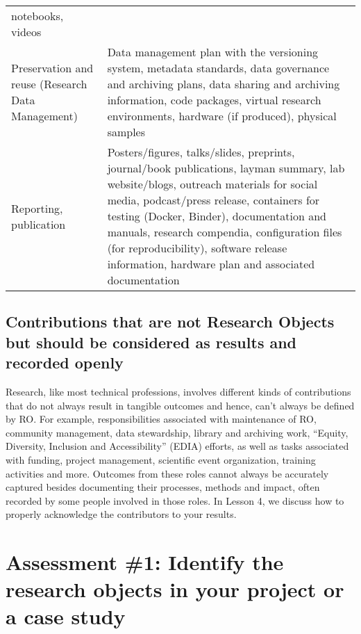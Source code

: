 \documentclass[
  letterpaper,
  DIV=11,
  numbers=noendperiod]{scrreport}
\begin{document}
\begin{longtable}[]{@{}
  >{\raggedright\arraybackslash}p{}
  >{\raggedright\arraybackslash}p{}@{}}
notebooks, videos \\
Preservation and reuse (Research Data Management) & Data management plan
with the versioning system, metadata standards, data governance and
archiving plans, data sharing and archiving information, code packages,
virtual research environments, hardware (if produced), physical
samples \\
Reporting, publication & Posters/figures, talks/slides, preprints,
journal/book publications, layman summary, lab website/blogs, outreach
materials for social media, podcast/press release, containers for
testing (Docker, Binder), documentation and manuals, research compendia,
configuration files (for reproducibility), software release information,
hardware plan and associated documentation \\
\bottomrule()
\end{longtable}

\hypertarget{contributions-that-are-not-research-objects-but-should-be-considered-as-results-and-recorded-openly}{%
\subsection{Contributions that are not Research Objects but should be
considered as results and recorded
openly}\label{contributions-that-are-not-research-objects-but-should-be-considered-as-results-and-recorded-openly}}

Research, like most technical professions, involves different kinds of
contributions that do not always result in tangible outcomes and hence,
can't always be defined by RO. For example, responsibilities associated
with maintenance of RO, community management, data stewardship, library
and archiving work, ``Equity, Diversity, Inclusion and Accessibility''
(EDIA) efforts, as well as tasks associated with funding, project
management, scientific event organization, training activities and more.
Outcomes from these roles cannot always be accurately captured besides
documenting their processes, methods and impact, often recorded by some
people involved in those roles. In Lesson 4, we discuss how to properly
acknowledge the contributors to your results.

\hypertarget{assessment-1-identify-the-research-objects-in-your-project-or-a-case-study}{%
\section{Assessment \#1: Identify the research objects in your project
or a case
study}\label{assessment-1-identify-the-research-objects-in-your-project-or-a-case-study}}
\end{document}
